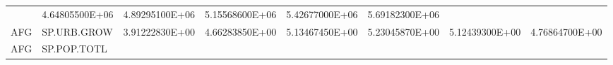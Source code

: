 \documentclass[]{article}
\begin{document}
\begin{longtable}[]{@{}llrrrrrr@{}}
\begin{minipage}[t]{0.11\columnwidth}
\end{minipage} & \begin{minipage}[t]{0.11\columnwidth}\raggedleft\strut
4.64805500E+06\strut
\end{minipage} & \begin{minipage}[t]{0.11\columnwidth}\raggedleft\strut
4.89295100E+06\strut
\end{minipage} & \begin{minipage}[t]{0.11\columnwidth}\raggedleft\strut
5.15568600E+06\strut
\end{minipage} & \begin{minipage}[t]{0.11\columnwidth}\raggedleft\strut
5.42677000E+06\strut
\end{minipage} & \begin{minipage}[t]{0.11\columnwidth}\raggedleft\strut
5.69182300E+06\strut
\end{minipage}\tabularnewline
\begin{minipage}[t]{0.06\columnwidth}\raggedright\strut
AFG\strut
\end{minipage} & \begin{minipage}[t]{0.08\columnwidth}\raggedright\strut
SP.URB.GROW\strut
\end{minipage} & \begin{minipage}[t]{0.11\columnwidth}\raggedleft\strut
3.91222830E+00\strut
\end{minipage} & \begin{minipage}[t]{0.11\columnwidth}\raggedleft\strut
4.66283850E+00\strut
\end{minipage} & \begin{minipage}[t]{0.11\columnwidth}\raggedleft\strut
5.13467450E+00\strut
\end{minipage} & \begin{minipage}[t]{0.11\columnwidth}\raggedleft\strut
5.23045870E+00\strut
\end{minipage} & \begin{minipage}[t]{0.11\columnwidth}\raggedleft\strut
5.12439300E+00\strut
\end{minipage} & \begin{minipage}[t]{0.11\columnwidth}\raggedleft\strut
4.76864700E+00\strut
\end{minipage}\tabularnewline
\begin{minipage}[t]{0.06\columnwidth}\raggedright\strut
AFG\strut
\end{minipage} & \begin{minipage}[t]{0.08\columnwidth}\raggedright\strut
SP.POP.TOTL\strut
\end{minipage} & \begin{minipage}[t]{0.11\columnwidth}\raggedleft\strut

\end{minipage}
\end{longtable}
\end{document}
